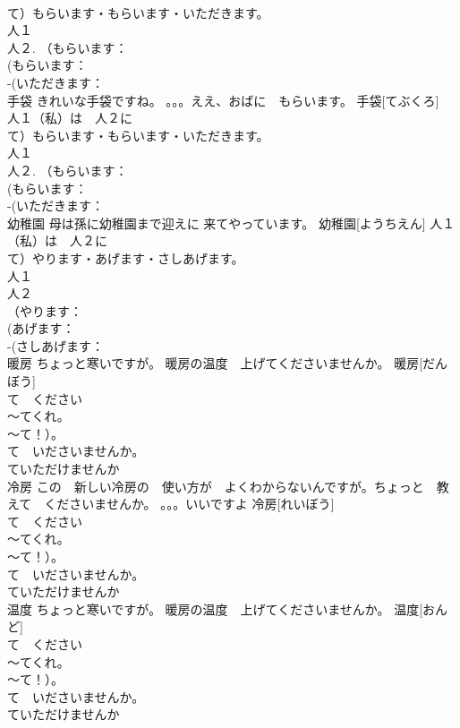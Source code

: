 \documentclass[8pt]{extreport}
\begin{document}
\begin{CJK}{UTF8}{min}
\\	て）もらいます・もらいます・いただきます。
\\	人１
\\	人２. （もらいます：
\\	(もらいます：
\\	-(いただきます：
\\	手袋	きれいな手袋ですね。 。。。ええ、おばに　もらいます。	手袋[てぶくろ]			
\\	人１（私）は　人２に　
\\	て）もらいます・もらいます・いただきます。
\\	人１
\\	人２. （もらいます：
\\	(もらいます：
\\	-(いただきます：
\\	幼稚園	母は孫に幼稚園まで迎えに 来てやっています。	幼稚園[ようちえん]				人１（私）は　人２に　
\\	て）やります・あげます・さしあげます。
\\	人１
\\	人２
\\	（やります：
\\	(あげます：
\\	-(さしあげます：
\\	暖房	ちょっと寒いですが。 暖房の温度　上げてくださいませんか。	暖房[だんぼう]			
\\	て　ください　
\\	～てくれ。
\\	～て！）。　
\\	て　いださいませんか。
\\	ていただけませんか 
\\	冷房	この　新しい冷房の　使い方が　よくわからないんですが。ちょっと　教えて　くださいませんか。 。。。いいですよ	冷房[れいぼう]			
\\	て　ください　
\\	～てくれ。
\\	～て！）。　
\\	て　いださいませんか。
\\	ていただけませんか 
\\	温度	ちょっと寒いですが。 暖房の温度　上げてくださいませんか。	温度[おんど]			
\\	て　ください　
\\	～てくれ。
\\	～て！）。　
\\	て　いださいませんか。
\\	ていただけませんか 

\end{CJK}
\end{document}
